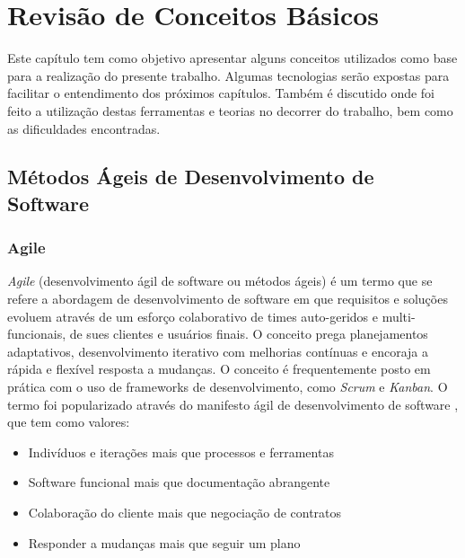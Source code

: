 \chapter{Revisão de Conceitos Básicos} \label{cap:concepts}
Este capítulo tem como objetivo apresentar alguns conceitos utilizados como base para a realização do presente trabalho. Algumas tecnologias serão expostas para facilitar o entendimento dos próximos capítulos. Também é discutido onde foi feito a utilização destas ferramentas e teorias no decorrer do trabalho, bem como as dificuldades encontradas.
\section{Métodos Ágeis de Desenvolvimento de Software}

\subsection{Agile}
\textit{Agile} (desenvolvimento ágil de software ou métodos ágeis) é um termo que se refere a abordagem de desenvolvimento de software em que requisitos e soluções evoluem através de um esforço colaborativo de times auto-geridos e multi-funcionais, de sues clientes e usuários finais. O conceito prega planejamentos adaptativos, desenvolvimento iterativo com melhorias contínuas e encoraja a rápida e flexível resposta a mudanças. O conceito é frequentemente posto em prática com o uso de frameworks de desenvolvimento, como \textit{Scrum} e \textit{Kanban}. O termo foi popularizado através do manifesto ágil de desenvolvimento de software , que tem como valores:

\begin{itemize}
    \item Indivíduos e iterações mais que processos e ferramentas
    \item Software funcional mais que documentação abrangente
    \item Colaboração do cliente mais que negociação de contratos
    \item Responder a mudanças mais que seguir um plano
\end{itemize}

